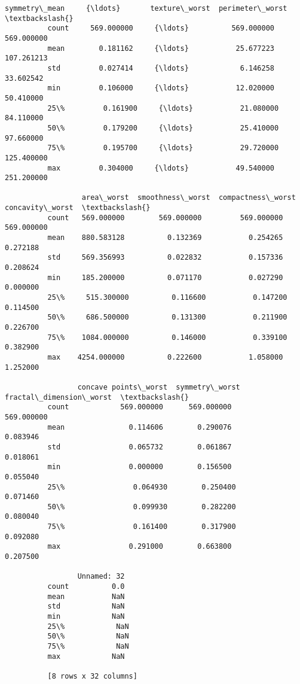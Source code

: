 \documentclass[11pt]{article}
\begin{document}
\begin{Verbatim}[commandchars=\\\{\}]
                 symmetry\_mean     {\ldots}       texture\_worst  perimeter\_worst  \textbackslash{}
          count     569.000000     {\ldots}          569.000000       569.000000   
          mean        0.181162     {\ldots}           25.677223       107.261213   
          std         0.027414     {\ldots}            6.146258        33.602542   
          min         0.106000     {\ldots}           12.020000        50.410000   
          25\%         0.161900     {\ldots}           21.080000        84.110000   
          50\%         0.179200     {\ldots}           25.410000        97.660000   
          75\%         0.195700     {\ldots}           29.720000       125.400000   
          max         0.304000     {\ldots}           49.540000       251.200000   
          
                  area\_worst  smoothness\_worst  compactness\_worst  concavity\_worst  \textbackslash{}
          count   569.000000        569.000000         569.000000       569.000000   
          mean    880.583128          0.132369           0.254265         0.272188   
          std     569.356993          0.022832           0.157336         0.208624   
          min     185.200000          0.071170           0.027290         0.000000   
          25\%     515.300000          0.116600           0.147200         0.114500   
          50\%     686.500000          0.131300           0.211900         0.226700   
          75\%    1084.000000          0.146000           0.339100         0.382900   
          max    4254.000000          0.222600           1.058000         1.252000   
          
                 concave points\_worst  symmetry\_worst  fractal\_dimension\_worst  \textbackslash{}
          count            569.000000      569.000000               569.000000   
          mean               0.114606        0.290076                 0.083946   
          std                0.065732        0.061867                 0.018061   
          min                0.000000        0.156500                 0.055040   
          25\%                0.064930        0.250400                 0.071460   
          50\%                0.099930        0.282200                 0.080040   
          75\%                0.161400        0.317900                 0.092080   
          max                0.291000        0.663800                 0.207500   
          
                 Unnamed: 32  
          count          0.0  
          mean           NaN  
          std            NaN  
          min            NaN  
          25\%            NaN  
          50\%            NaN  
          75\%            NaN  
          max            NaN  
          
          [8 rows x 32 columns]
\end{Verbatim}
            
\end{document}
